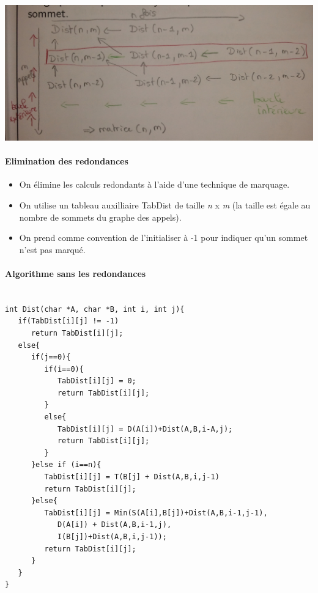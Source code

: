\includegraphics[width=15cm]{Photo0090}

\paragraph{Elimination des redondances}

\begin{itemize}
\item On élimine les calculs redondants à l'aide d'une technique de marquage.
\item On utilise un tableau auxilliaire TabDist de taille \textit{n} x \textit{m} (la taille est égale au nombre de sommets du graphe des appels).
\item On prend comme convention de l'initialiser à -1 pour indiquer qu'un sommet n'est pas marqué.
\end{itemize}

\paragraph{Algorithme sans les redondances}
\begin{verbatim}

int Dist(char *A, char *B, int i, int j){
   if(TabDist[i][j] != -1)
      return TabDist[i][j];
   else{
      if(j==0){
         if(i==0){
            TabDist[i][j] = 0;
            return TabDist[i][j];
         }
         else{
            TabDist[i][j] = D(A[i])+Dist(A,B,i-A,j);
            return TabDist[i][j];
         }
      }else if (i==n){
         TabDist[i][j] = T(B[j] + Dist(A,B,i,j-1)
         return TabDist[i][j];
      }else{
         TabDist[i][j] = Min(S(A[i],B[j])+Dist(A,B,i-1,j-1),
            D(A[i]) + Dist(A,B,i-1,j),
            I(B[j])+Dist(A,B,i,j-1));
         return TabDist[i][j];
      }
   }
}
\end{verbatim}
